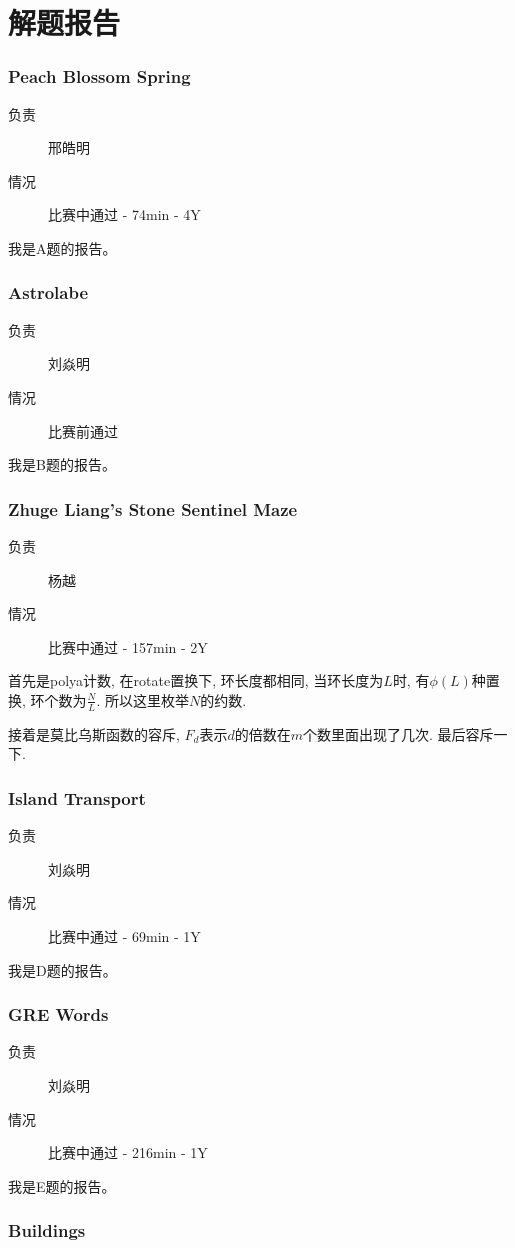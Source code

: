 \documentclass[a4paper, 11pt, nofonts, nocap, fancyhdr]{ctexart}
\newcommand{\problem}[1]{\subsubsection{#1}}
\begin{document}
\section{解题报告}


\problem{Peach Blossom Spring}

\begin{description}
\item[负责] 邢皓明
\item[情况] 比赛中通过 - 74min - 4Y
\end{description}

我是A题的报告。

\problem{Astrolabe}

\begin{description}
\item[负责] 刘焱明
\item[情况] 比赛前通过
\end{description}

我是B题的报告。

\problem{Zhuge Liang's Stone Sentinel Maze}

\begin{description}
\item[负责] 杨越
\item[情况] 比赛中通过 - 157min - 2Y
\end{description}

首先是polya计数, 在rotate置换下, 环长度都相同, 当环长度为$L$时, 有$\phi(L)$种置换, 环个数为$\frac{N}{L}$. 所以这里枚举$N$的约数.

接着是莫比乌斯函数的容斥, $F_d$表示$d$的倍数在$m$个数里面出现了几次. 最后容斥一下.

\problem{Island Transport}

\begin{description}
\item[负责] 刘焱明
\item[情况] 比赛中通过 - 69min - 1Y
\end{description}

我是D题的报告。

\problem{GRE Words}

\begin{description}
\item[负责] 刘焱明
\item[情况] 比赛中通过 - 216min - 1Y
\end{description}

我是E题的报告。

\problem{Buildings}
\end{document}
